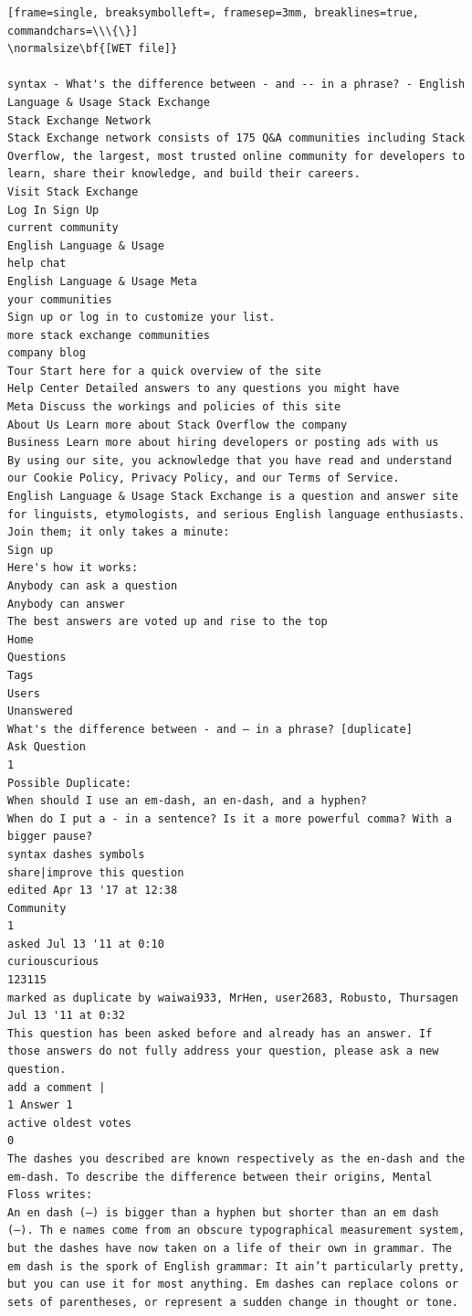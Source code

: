\documentclass{article}
\begin{document}
\begin{tiny}
\begin{Verbatim}[frame=single, breaksymbolleft=, framesep=3mm, breaklines=true, commandchars=\\\{\}]
\normalsize\bf{[WET file]}

syntax - What's the difference between - and -- in a phrase? - English Language & Usage Stack Exchange
Stack Exchange Network
Stack Exchange network consists of 175 Q&A communities including Stack Overflow, the largest, most trusted online community for developers to learn, share their knowledge, and build their careers.
Visit Stack Exchange
Log In Sign Up
current community
English Language & Usage
help chat
English Language & Usage Meta
your communities
Sign up or log in to customize your list.
more stack exchange communities
company blog
Tour Start here for a quick overview of the site
Help Center Detailed answers to any questions you might have
Meta Discuss the workings and policies of this site
About Us Learn more about Stack Overflow the company
Business Learn more about hiring developers or posting ads with us
By using our site, you acknowledge that you have read and understand our Cookie Policy, Privacy Policy, and our Terms of Service.
English Language & Usage Stack Exchange is a question and answer site for linguists, etymologists, and serious English language enthusiasts. Join them; it only takes a minute:
Sign up
Here's how it works:
Anybody can ask a question
Anybody can answer
The best answers are voted up and rise to the top
Home
Questions
Tags
Users
Unanswered
What's the difference between - and — in a phrase? [duplicate]
Ask Question
1
Possible Duplicate:
When should I use an em-dash, an en-dash, and a hyphen?
When do I put a - in a sentence? Is it a more powerful comma? With a bigger pause?
syntax dashes symbols
share|improve this question
edited Apr 13 '17 at 12:38
Community
1
asked Jul 13 '11 at 0:10
curiouscurious
123115
marked as duplicate by waiwai933, MrHen, user2683, Robusto, Thursagen Jul 13 '11 at 0:32
This question has been asked before and already has an answer. If those answers do not fully address your question, please ask a new question.
add a comment |
1 Answer 1
active oldest votes
0
The dashes you described are known respectively as the en-dash and the em-dash. To describe the difference between their origins, Mental Floss writes:
An en dash (–) is bigger than a hyphen but shorter than an em dash (—). Th e names come from an obscure typographical measurement system, but the dashes have now taken on a life of their own in grammar. The em dash is the spork of English grammar: It ain’t particularly pretty, but you can use it for most anything. Em dashes can replace colons or sets of parentheses, or represent a sudden change in thought or tone.

\end{Verbatim}
\end{tiny}
\end{document}
